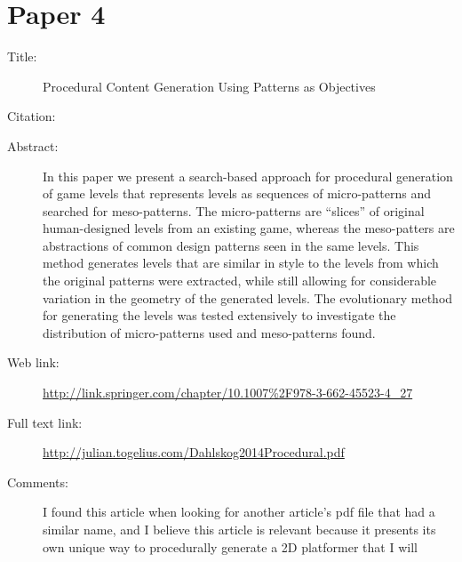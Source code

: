 \documentclass{scrartcl}
\begin{document}
\section*{Paper 4}
\begin{description}
\item[Title:] Procedural Content Generation Using Patterns as Objectives
\item[Citation:] \cite{dahlskog2014}
\item[Abstract:] In this paper we present a search-based approach for procedural generation of game levels that represents levels as sequences of micro-patterns and searched for meso-patterns. The micro-patterns are “slices” of original human-designed levels from an existing game, whereas the meso-patters are abstractions of common design patterns seen in the same levels. This method generates levels that are similar in style to the levels from which the original patterns were extracted, while still allowing for considerable variation in the geometry of the generated levels. The evolutionary method for generating the levels was tested extensively to investigate the distribution of micro-patterns used and meso-patterns found.

\item[Web link:] \url{http://link.springer.com/chapter/10.1007%2F978-3-662-45523-4_27}
\item[Full text link:] \url{http://julian.togelius.com/Dahlskog2014Procedural.pdf}
\item[Comments:] I found this article when looking for another article's pdf file that had a similar name, and I believe this article is relevant because it presents its own unique way to procedurally generate a 2D platformer that I will 
\end{description}
\end{document}
